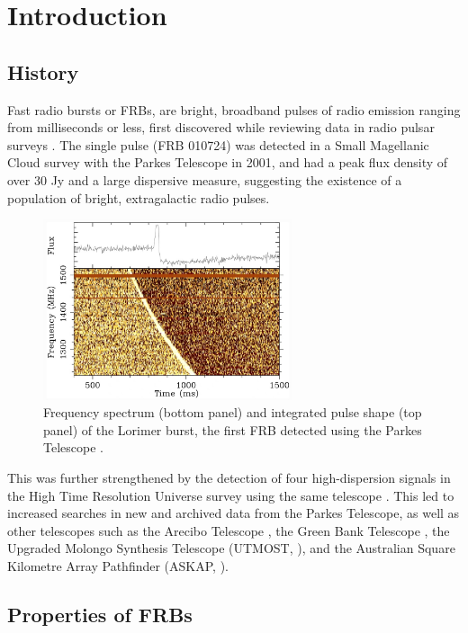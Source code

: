 \chapter{Introduction}

\section{History}

Fast radio bursts or FRBs, are bright, broadband pulses of radio emission ranging from milliseconds or less, first discovered while reviewing data in radio pulsar surveys \cite{Lorimer2007}. The single pulse (FRB 010724) was detected in a Small Magellanic Cloud survey with the Parkes Telescope in 2001, and had a peak flux density of over 30 Jy and a large dispersive measure, suggesting the existence of a population of bright, extragalactic radio pulses. 

\begin{figure}
    \centering
    \includegraphics[width=0.65\textwidth]{Images/lorimer.jpg}
    \caption[Lorimer burst]{Frequency spectrum (bottom panel) and integrated pulse shape (top panel) of the Lorimer burst, the first FRB detected using the Parkes Telescope \protect\cite{Lorimer2007}.}
    \label{fig:lorimer}
\end{figure}

This was further strengthened by the detection of four high-dispersion signals in the High Time Resolution Universe survey using the same telescope \cite{Keith2010}. This led to increased searches in new and archived data from the Parkes Telescope, as well as other telescopes such as the Arecibo Telescope \cite{Spitler2014}, the Green Bank Telescope \cite{Masui2015}, the Upgraded Molongo Synthesis Telescope (UTMOST, ), and the Australian Square Kilometre Array Pathfinder (ASKAP, \cite{Bannister2017}). 

\section{Properties of FRBs}

